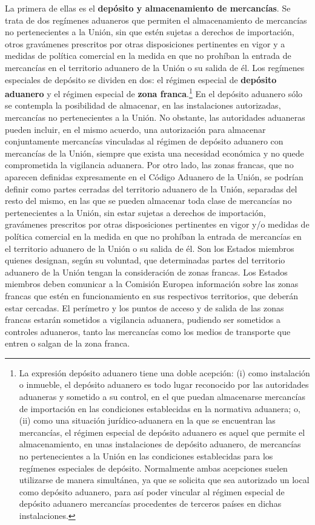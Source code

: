 \documentclass[10pt,a4paper]{article}
\begin{document}
La primera de ellas es el \textbf{depósito y almacenamiento de mercancías}. Se trata de dos regímenes aduaneros que permiten el almacenamiento de mercancías no pertenecientes a la Unión, sin que estén sujetas a derechos de importación, otros gravámenes prescritos por otras disposiciones pertinentes en vigor y a medidas de política comercial en la medida en que no prohíban la entrada de mercancías en el territorio aduanero de la Unión o su salida de él. Los regímenes especiales de depósito se dividen en dos: el régimen especial de \textbf{depósito aduanero} y el régimen especial de \textbf{zona franca}.\footnote{%
    La expresión depósito aduanero tiene una doble acepción: (i) como instalación o inmueble, el depósito aduanero es todo lugar reconocido por las autoridades aduaneras y sometido a su control, en el que puedan almacenarse mercancías de importación en las condiciones establecidas en la normativa aduanera; o, (ii) como una situación jurídico-aduanera en la que se encuentran las mercancías, el régimen especial de depósito aduanero es aquel que permite el almacenamiento, en unas instalaciones de depósito aduanero, de mercancías no pertenecientes a la Unión en las condiciones establecidas para los regímenes especiales de depósito. Normalmente ambas acepciones suelen utilizarse de manera simultánea, ya que se solicita que sea autorizado un local como depósito aduanero, para así poder vincular al régimen especial de depósito aduanero mercancías procedentes de terceros países en dichas instalaciones.
} En el depósito aduanero sólo se contempla la posibilidad de almacenar, en las instalaciones autorizadas, mercancías no pertenecientes a la Unión. No obstante, las autoridades aduaneras pueden incluir, en el mismo acuerdo, una autorización para almacenar conjuntamente mercancías vinculadas al régimen de depósito aduanero con mercancías de la Unión, siempre que exista una necesidad económica y no quede comprometida la vigilancia aduanera. Por otro lado, las zonas francas, que no aparecen definidas expresamente en el Código Aduanero de la Unión, se podrían definir como partes cerradas del territorio aduanero de la Unión, separadas del resto del mismo, en las que se pueden almacenar toda clase de mercancías no pertenecientes a la Unión, sin estar sujetas a derechos de importación, gravámenes prescritos por otras disposiciones pertinentes en vigor y/o medidas de política comercial en la medida en que no prohíban la entrada de mercancías en el territorio aduanero de la Unión o su salida de él. Son los Estados miembros quienes designan, según su voluntad, que determinadas partes del territorio aduanero de la Unión tengan la consideración de zonas francas. Los Estados miembros deben comunicar a la Comisión Europea información sobre las zonas francas que estén en funcionamiento en sus respectivos territorios, que deberán estar cercadas. El perímetro y los puntos de acceso y de salida de las zonas francas estarán sometidos a vigilancia aduanera, pudiendo ser sometidos a controles aduaneros, tanto las mercancías como los medios de transporte que entren o salgan de la zona franca.
\end{document}
